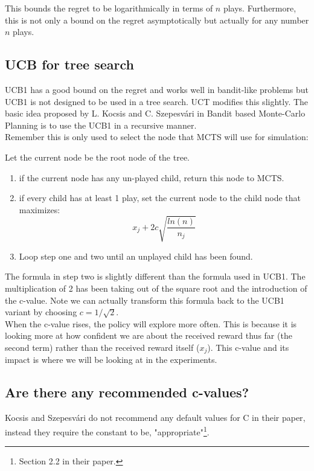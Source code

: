 \documentclass[
11pt, %
english, %
singlespacing, %
headsepline, %
]{MastersDoctoralThesis} %
\begin{document}
This bounds the regret to be logarithmically in terms of $n$ plays. Furthermore, this is not only a bound on the regret asymptotically but actually for any number $n$ plays.

\subsection{UCB for tree search}
UCB1 has a good bound on the regret and works well in bandit-like problems but UCB1 is not designed to be used in a tree search. UCT modifies this slightly. The basic idea proposed by L. Kocsis and C. Szepesv{\'a}ri in Bandit based Monte-Carlo Planning\cite{Kocsis:2006} is to use the UCB1 in a recursive manner.\\

Remember this is only used to select the node that MCTS will use for simulation:

Let the current node be the root node of the tree.
\begin{enumerate}
	\item if the current node has any un-played child, return this node to MCTS.
	\item if every child has at least 1 play, set the current node to the child node that maximizes:
	\[
	x_j + 2c\sqrt{\dfrac{ln(n)}{n_j}}
	\]
	\item Loop step one and two until an unplayed child has been found.
\end{enumerate}


The formula in step two is slightly different than the formula used in UCB1. The multiplication of 2 has been taking out of the square root and the introduction of the c-value. Note we can actually transform this formula back to the UCB1 variant by choosing $c = 1/\sqrt{2}$.\\

When the c-value rises, the policy will explore more often. This is because it is looking more at how confident we are about the received reward thus far (the second term) rather than the received reward itself ($x_j$). This c-value and its impact is where we will be looking at in the experiments.

\subsection{Are there any recommended c-values?}
Kocsis and Szepesv{\'a}ri do not recommend any default values for C in their paper\cite{Kocsis:2006}, instead they require the constant to be, "appropriate"\footnote{Section 2.2 in their paper\cite{Kocsis:2006}.}.
\end{document}
